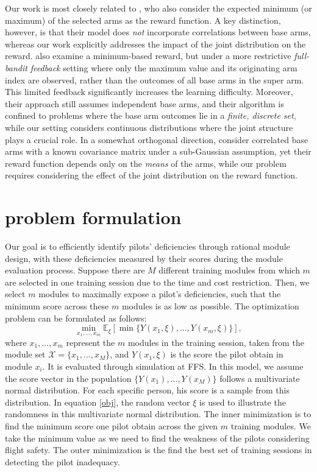 \documentclass[opre,sglanonrev]{informs4}
\begin{document}
Our work is most closely related to \citep{Chen2016CombinatorialMB}, who also consider the expected minimum (or maximum) of the selected arms as the reward function. A key distinction, however, is that their model does \emph{not} incorporate correlations between base arms, whereas our work explicitly addresses the impact of the joint distribution on the reward. \citep{Wang2023CombinatorialBF} also examine a minimum-based reward, but under a more restrictive \emph{full-bandit feedback} setting where only the maximum value and its originating arm index are observed, rather than the outcomes of all base arms in the super arm. This limited feedback significantly increases the learning difficulty. Moreover, their approach still assumes independent base arms, and their algorithm is confined to problems where the base arm outcomes lie in a \emph{finite, discrete set}, while our setting considers continuous distributions where the joint structure plays a crucial role. In a somewhat orthogonal direction, \citep{Degenne2016CombinatorialSW} consider correlated base arms with a known covariance matrix under a sub-Gaussian assumption, yet their reward function depends only on the \emph{means} of the arms, while our problem requires considering the effect of the joint distribution on the reward function.

\section{problem formulation}
\label{problem formulation}
Our goal is to efficiently identify pilots’ deficiencies through rational module design, with these deficiencies measured by their scores during the module evaluation process. Suppose there are $M$ different training modules from which $m$ are selected in one training session due to the time and cost restriction. Then, we select $m$ modules to maximally expose a pilot’s deficiencies, such that the minimum score across these $m$ modules is as low as possible. The optimization problem can be formulated as follows:
\begin{equation}
	\min_{x_1,...,x_m} \mathbb{E}_\xi[\min\{Y(x_1,\xi),...,Y(x_m,\xi) \} ], 
	\label{obj}
\end{equation}
where $x_1,...,x_m$ represent the $m$ modules in the training session, taken from the module set $\mathcal{X} = \{x_1,...,x_M\}$, and $Y(x_1,\xi)$ is the score the pilot obtain in module $x_i$. It is evaluated through simulation at FFS. In this model, we assume the score vector in the population $\{Y(x_1),...,Y(x_M)\}$ follows a multivariate normal distribution. For each specific person, his score is a sample from this distribution. In equation \eqref{obj}, the random vector $\xi$ is used to illustrate the randomness in this multivariate normal distribution. The inner minimization is to find the minimum score one pilot obtain across the given $m$ training modules. We take the minimum value as we need to find the weakness of the pilots considering flight safety. The outer minimization is the find the best set of training sessions in detecting the pilot inadequacy.
\end{document}
